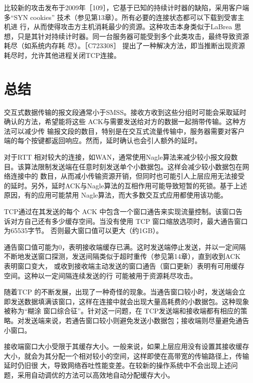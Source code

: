 比较新的攻击发布于2009年［109］，它基于已知的持续计时器的缺陷，采用客户端多“SYN cookies” 技术（参见第13章）。所有必要的连接状态都可以下载到受害主机进
行，从而使得攻击方主机消耗最少的资源。这种攻击本身类似于LaBrea 思想，只是其针对持续计时器。同一台服务器可能受到多个此类攻击，最终导致资源耗尽（如系统内存耗
尽）。［C723308］ 提出了一种解决方法，即当推断出现资源耗尽时，允许其他进程关闭TCP连接。


\section{总结}

交互式数据传输的报文段通常小于SMSS。接收方收到这些分组时可能会采取延时确认的方法，希望能将这些 ACK与需要发送给对方的数据一起捎带传输。这种方法可以减少传
输报文段的数目，特别是在交互式流量传输中，服务器需要对客户端的每个按键都返回响应。然而，延时确认也会引人额外的延时。

对于RTT 相对较大的连接，如WAN，通常使用Nagle算法来减少较小报文段数目。该算法限制发送端在任意时刻发送单个小数据包。这样会减少较小数据包在网络连接中的
数目，从而减小传输资源开销，但同时也可能引人上层应用无法接受的延时。另外，延时ACK与Nagle算法的互相作用可能导致短暂的死锁。基于上述原因，有的应用可能禁用
Nagle算法，而大多数交互式应用都使用该功能。

TCP通过在其发送的每个 ACK 中包含一个窗口通告来实现流量控制。该窗口告诉对方自己还有多少缓存空间。当没有使用 TCP 窗口缩放选项时，最大通告窗口为65535字节。
否则最大窗口值可以更大（约1GB）。

通告窗口值可能为0，表明接收端缓存已满。这时发送端停止发送，并以一定间隔不断地发送窗口探测，发送间隔类似于超时重传（参见第14章），直到收到ACK 表明窗口变大，
或收到接收端主动发送的窗口通告（窗口更新）表明有可用缓存空间。这种以一定间隔连续发送的行 可能被用于资源耗尽攻击。

随着TCP 的不断发展，出现了一种奇怪的现象。当通告窗口较小时，发送端会立即发送数据填满该窗口，这样在连接中就会出现大量高耗费的小数据包。这种现象被称为“糊涂
窗口综合征”。针对这一问题，在 TCP发送端和接收端都有相应的策略。对发送端来说，若通告窗口较小则避免发送小数据包；接收端则尽量避免通告小窗口。

接收端窗口大小受限于其缓存大小。一般来说，如果上层应用没有设置其接收缓存大小，就会为其分配一个相对较小的空间，这样即使在高带宽的传输路径上，传输延时仍旧很
大，导致网络吞吐性能变差。在较新的操作系统中不会出现上述问题，采用自动调优的方法可以高效地自动分配缓存大小。
